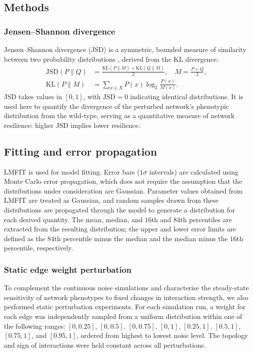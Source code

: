\documentclass[11pt]{article}
\newcommand{\jsd}{\mathrm{JSD}}
\begin{document}
\subsection{Methods}

\subsubsection{Jensen--Shannon divergence}\label{sssec:jsd_def}
Jensen--Shannon divergence (JSD) is a symmetric, bounded measure of similarity between two probability distributions \cite{menendez1997jensen}, derived from the KL divergence:
\begin{align}
    \jsd(P \| Q) &= \frac{\mathrm{KL}(P \| M) + \mathrm{KL}(Q \| M)}{2}, \quad M = \frac{P + Q}{2}, \label{eq:jsd_def} \\
    \mathrm{KL}(P \| M) &= \sum_{x \in X} P(x) \log_2 \frac{P(x)}{M(x)}.
\end{align}
JSD takes values in $[0, 1]$, with $\mathrm{JSD} = 0$ indicating identical distributions. It is used here to quantify the divergence of the perturbed network's phenotypic distribution from the wild-type, serving as a quantitative measure of network resilience: higher JSD implies lower resilience.

\subsection{Fitting and error propagation}\label{ssec:fit_meth}
LMFIT \cite{https://doi.org/10.5281/zenodo.598352} is used for model fitting. Error bars ($1\sigma$ intervals) are calculated using Monte Carlo error propagation, which does not require the assumption that the distributions under consideration are Gaussian. Parameter values obtained from LMFIT are treated as Gaussian, and random samples drawn from these distributions are propagated through the model to generate a distribution for each derived quantity. The mean, median, and $16$th and $84$th percentiles are extracted from the resulting distribution; the upper and lower error limits are defined as the $84$th percentile minus the median and the median minus the $16$th percentile, respectively.

\subsubsection{Static edge weight perturbation}

To complement the continuous noise simulations and characterise the steady-state sensitivity of network phenotypes to fixed changes in interaction strength, we also performed static perturbation experiments. For each simulation run, a weight for each edge was independently sampled from a uniform distribution within one of the following ranges: $[0, 0.25]$, $[0, 0.5]$, $[0, 0.75]$, $[0, 1]$, $[0.25, 1]$, $[0.5, 1]$, $[0.75, 1]$, and $[0.95, 1]$, ordered from highest to lowest noise level. The topology and sign of interactions were held constant across all perturbations.
\end{document}
